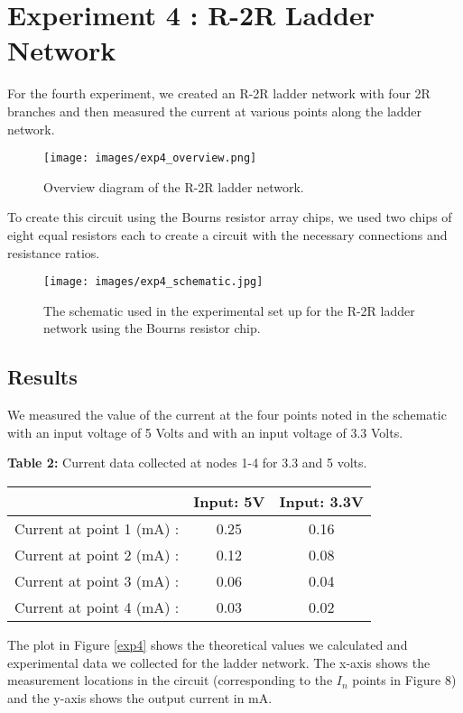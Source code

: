 \documentclass{article}
\begin{document}
\section{Experiment 4 : R-2R Ladder Network}
For the fourth experiment, we created an R-2R ladder network with four 2R branches and then measured the current at various points along the ladder network.

\begin{figure}[H]
    \centering
    \texttt{[image: images/exp4\_overview.png]}
    \caption{Overview diagram of the R-2R ladder network.}
    \label{fig:ramp}
\end{figure}

To create this circuit using the Bourns resistor array chips, we used two chips of eight equal resistors each to create a circuit with the necessary connections and resistance ratios.

\begin{figure}[H]
    \centering
    \texttt{[image: images/exp4\_schematic.jpg]}
    \caption{The schematic used in the experimental set up for the R-2R ladder network using the Bourns resistor chip.}
    \label{fig:ramp}
\end{figure}

\subsection{Results}
We measured the value of the current at the four points noted in the schematic with an input voltage of 5 Volts and with an input voltage of 3.3 Volts.
\begin{center}
\textbf{Table 2:} Current data collected at nodes 1-4  for 3.3 and 5 volts. 

\small\addtolength{\tabcolsep}{-5pt} 
    \begin{tabular}{|c|c|c|}
        \hline
          & Input: 5V & Input: 3.3V \\ \hline
        Current at point 1 (mA) :& 0.25 & 0.16\\ \hline
        Current at point 2 (mA) :& 0.12 & 0.08\\ \hline
        Current at point 3 (mA) :& 
       0.06 & 0.04\\ \hline
        Current at point 4 (mA) :& 
        0.03 & 0.02\\ \hline
    \end{tabular}
\end{center}

The plot in Figure \ref{exp4} shows the theoretical values we calculated and experimental data we collected for the ladder network. The x-axis shows the measurement locations in the circuit (corresponding to the $I_n$ points in Figure 8) and the y-axis shows the output current in mA.
\end{document}
